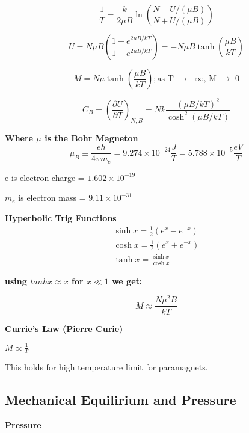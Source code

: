 \documentclass[11pt]{article}
\theoremstyle{definition}
\begin{document}
\begin{equation}
\frac{1}{T} = \frac{k}{2\mu B}\ln\left(\frac{N-U/(\mu B)}{N+U/(\mu B)}\right)  
\end{equation}

\begin{equation}
    U = N \mu B \left( \frac{1-e^{2\mu B/kT}}{1+e^{2\mu B/kT}}\right) = -N\mu B \tanh{\left(\frac{\mu B}{kT}\right)}
\end{equation}

\begin{equation}
    M = N \mu \tanh{\left(\frac{\mu B}{kT}\right)} ; \text{as T $\rightarrow$ $\infty$, M $\rightarrow$ 0}
\end{equation}


\begin{equation}
    C_B = \left(\frac{\partial U}{\partial T}\right)_{N, B} = Nk \frac{(\mu B/kT)^2}{\cosh^2{(\mu B/kT)}}
\end{equation}

\textbf{Where $\mu$ is the Bohr Magneton}
\[\mu_B \equiv \frac{eh}{4\pi m_e} = 9.274 \times 10^{-24} \frac{J}{T} = 5.788 \times 10^{-5} \frac{eV}{T}\]

e is electron charge = $1.602 \times 10^{-19}$

$m_e$ is electron mass = $9.11 \times 10^{-31}$


\textbf{Hyperbolic Trig Functions}
\begin{equation*}
\begin{split}
   \sinh{x} = \frac{1}{2}(e^x - e^{-x})\\
   \cosh{x} = \frac{1}{2}(e^x + e^{-x})\\
   \tanh{x} = \frac{\sinh{x}}{\cosh{x}}
\end{split}
\end{equation*}

\textbf{using $tanh{x} \approx x$ for $x \ll 1$ we get:}

\[M \approx \frac{N\mu ^2 B}{kT} \]

\textbf{Currie's Law (Pierre Curie)}

$M \propto \frac{1}{T}$

This holds for high temperature limit for paramagnets.

\subsection{Mechanical Equilirium and Pressure}

\textbf{Pressure}
\end{document}
